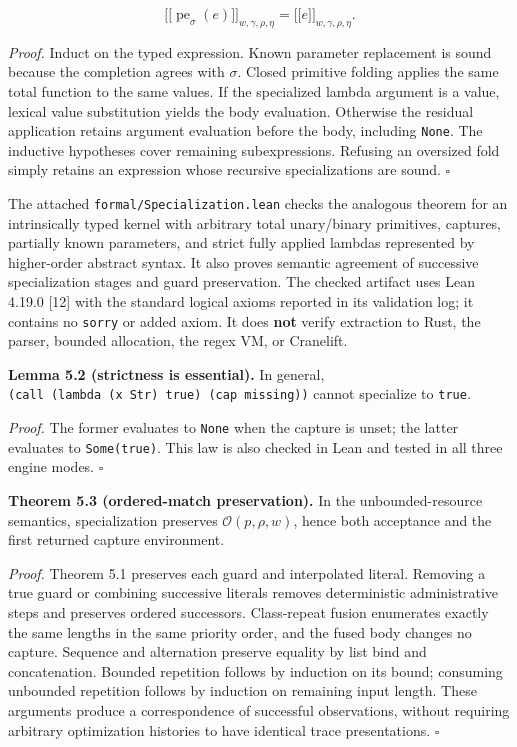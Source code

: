 \documentclass[
  11pt,
]{article}
\begin{document}
\[ \mathopen{[\![}\operatorname{pe}_\sigma(e)\mathclose{]\!]}_{w,\gamma,\rho,\eta}
=\mathopen{[\![}e\mathclose{]\!]}_{w,\gamma,\rho,\eta}. \]

\emph{Proof.} Induct on the typed expression. Known parameter
replacement is sound because the completion agrees with \(\sigma\).
Closed primitive folding applies the same total function to the same
values. If the specialized lambda argument is a value, lexical value
substitution yields the body evaluation. Otherwise the residual
application retains argument evaluation before the body, including
\texttt{None}. The inductive hypotheses cover remaining subexpressions.
Refusing an oversized fold simply retains an expression whose recursive
specializations are sound. \(\square\)

The attached \texttt{formal/Specialization.lean} checks the analogous
theorem for an intrinsically typed kernel with arbitrary total
unary/binary primitives, captures, partially known parameters, and
strict fully applied lambdas represented by higher-order abstract
syntax. It also proves semantic agreement of successive specialization
stages and guard preservation. The checked artifact uses Lean 4.19.0
{[}12{]} with the standard logical axioms reported in its validation
log; it contains no \texttt{sorry} or added axiom. It does \textbf{not}
verify extraction to Rust, the parser, bounded allocation, the regex VM,
or Cranelift.

\textbf{Lemma 5.2 (strictness is essential).} In general,
\texttt{(call\ (lambda\ (x\ Str)\ true)\ (cap\ missing))} cannot
specialize to \texttt{true}.

\emph{Proof.} The former evaluates to \texttt{None} when the capture is
unset; the latter evaluates to \texttt{Some(true)}. This law is also
checked in Lean and tested in all three engine modes. \(\square\)

\textbf{Theorem 5.3 (ordered-match preservation).} In the
unbounded-resource semantics, specialization preserves
\(\mathcal O(p,\rho,w)\), hence both acceptance and the first returned
capture environment.

\emph{Proof.} Theorem 5.1 preserves each guard and interpolated literal.
Removing a true guard or combining successive literals removes
deterministic administrative steps and preserves ordered successors.
Class-repeat fusion enumerates exactly the same lengths in the same
priority order, and the fused body changes no capture. Sequence and
alternation preserve equality by list bind and concatenation. Bounded
repetition follows by induction on its bound; consuming unbounded
repetition follows by induction on remaining input length. These
arguments produce a correspondence of successful observations, without
requiring arbitrary optimization histories to have identical trace
presentations. \(\square\)
\end{document}
